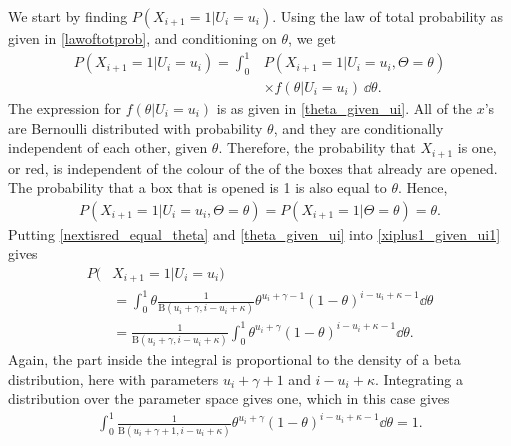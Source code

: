 We start by finding $P(X_{i+1}=1|U_i=u_i)$. Using the law of total probability as given in \eqref{lawoftotprob}, and conditioning on $\theta$, we get
\begin{equation}
\label{xiplus1_given_ui1}
    \begin{aligned}
        P(X_{i+1}=1|U_i=u_i)
        = \int_0^1 & P(X_{i+1}=1|U_i=u_i,\Theta=\theta)\\[6pt]
        &\times f(\theta|U_i=u_i)\: \dd \theta.
    \end{aligned}
\end{equation}
The expression for $f(\theta|U_i=u_i)$ is as given in \eqref{theta_given_ui}. All of the $x$'s are Bernoulli distributed with probability $\theta$, and they are conditionally independent of each other, given $\theta$. Therefore, the probability that $X_{i+1}$ is one, or red, is independent of the colour of the of the boxes that already are opened. The probability that a box that is opened is 1 is also equal to $\theta$. Hence,
\begin{equation}
\label{nextisred_equal_theta}
    \begin{aligned}
        P(X_{i+1}=1|U_i=u_i,\Theta=\theta) = P(X_{i+1}=1|\Theta=\theta) = \theta.
    \end{aligned}
\end{equation}
Putting \eqref{nextisred_equal_theta} and \eqref{theta_given_ui} into \eqref{xiplus1_given_ui1} gives
\begin{equation}
\label{xiplus1_given_ui2}
    \begin{aligned}
        P(&X_{i+1}=1|U_i=u_i)\\
        &= \int_0^1 \theta \frac{1}{\text{B}(u_i+\gamma,i-u_i+\kappa)}\theta^{u_i+\gamma-1}(1-\theta)^{i-u_i+\kappa-1}  \dd \theta\\[6pt]
        &=\frac{1}{\text{B}(u_i+\gamma,i-u_i+\kappa)} \int_0^1 \theta^{u_i+\gamma}(1-\theta)^{i-u_i+\kappa-1} \dd \theta.
    \end{aligned}
\end{equation}
Again, the part inside the integral is proportional to the density of a beta distribution, here with parameters $u_i+\gamma+1$ and $i-u_i+\kappa$. Integrating a distribution over the parameter space gives one, which in this case gives
\begin{equation*}
    \begin{aligned}
        \int_0^1 \frac{1}{\text{B}(u_i+\gamma+1,i-u_i+\kappa)} \theta^{u_i+\gamma}(1-\theta)^{i-u_i+\kappa-1}  \dd \theta = 1.
    \end{aligned}
\end{equation*}
